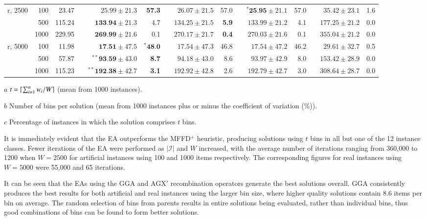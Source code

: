 \documentclass[authoryear]{elsarticle}
\begin{document}
\begin{table}[h!]
\begin{threeparttable}
\begin{tabular}{crrcrrcrrcrrcrr}
	\midrule
	\midrule
	r, 2500 & 100 & 23.47 && $25.99 \pm 21.3$ & \textbf{57.3} && $26.07 \pm 21.5$ & 57.0 && $^{*}\textbf{25.95} \pm 21.1$ & 57.0 && $35.42 \pm 23.1$ & 1.6 \\
	& 500 & 115.24 && $\textbf{133.94} \pm 21.3$ & 4.7 && $134.25 \pm 21.5$ & \textbf{5.9} && $133.99 \pm 21.2$ & 4.1 && $177.25 \pm 21.2$ & 0.0 \\
	& 1000 & 229.95 && $\textbf{269.99} \pm 21.6$ & 0.1 && $270.17 \pm 21.7$ & \textbf{0.4} && $270.03 \pm 21.6$ & 0.1 && $355.04 \pm 21.2$ & 0.0 \\
	\midrule
	r, 5000 & 100 & 11.98 && $\textbf{17.51} \pm 47.5$ & $^{*}\textbf{48.0}$ && $17.54 \pm 47.3$ & 46.8 && $17.54 \pm 47.2$ & 46.2 && $29.61 \pm 32.7$ & 0.5 \\
	& 500 & 57.87 && $^{**}\textbf{93.59} \pm 43.0$ & \textbf{8.7} && $94.18 \pm 43.0$ & 8.6 && $93.97 \pm 42.9$ & 8.0 && $153.42 \pm 28.9$ & 0.0 \\
	& 1000 & 115.23 && $^{**}\textbf{192.38} \pm 42.7$ & \textbf{3.1} && $192.92 \pm 42.8$ & 2.6 && $192.79 \pm 42.7$ & 3.0 && $308.64 \pm 28.7$ & 0.0 \\
	\bottomrule
\end{tabular}	
\vspace{0.2cm} %
\begin{tablenotes}
	\scriptsize
	\item[$a$] $t = \lceil\sum_{i=1}^{n} w_i / W\rceil$ (mean from 1000 instances).
	\item[$b$] Number of bins per solution (mean from 1000 instances plus or minus the coefficient of variation (\%)).
	\item[$c$] Percentage of instances in which the solution comprises $t$ bins.
\end{tablenotes}
\end{threeparttable}
\label{table:ea}
\end{table}

It is immediately evident that the EA outperforms the MFFD$^+$ heuristic, producing solutions using $t$ bins in all but one of the 12 instance classes. Fewer iterations of the EA were performed as $|\mathcal{I}|$ and $W$ increased, with the average number of iterations ranging from 360,000 to 1200 when $W=2500$ for artificial instances using 100 and 1000 items respectively. The corresponding figures for real instances using $W=5000$ were 55,000 and 65 iterations.

It can be seen that the EAs using the GGA and AGX$'$ recombination operators generate the best solutions overall. GGA consistently produces the best results for both artificial and real instances using the larger bin size, where higher quality solutions contain 8.6 items per bin on average. The random selection of bins from parents results in entire solutions being evaluated, rather than individual bins, thus good combinations of bins can be found to form better solutions.
\end{document}
